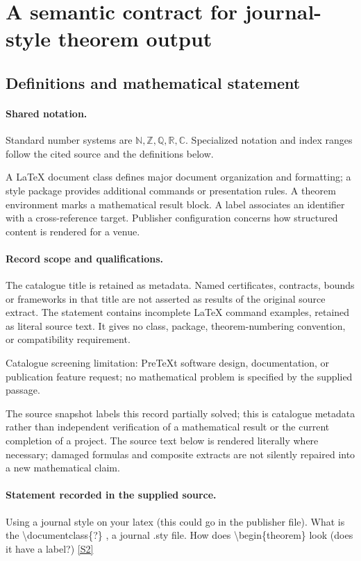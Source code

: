 \documentclass[11pt]{article}
\newcommand{\sref}[2]{\hyperlink{source:#1:#2}{[S#2]}}
\begin{document}
\section{A semantic contract for journal-style theorem output}\label{statement}

\subsection{Definitions and mathematical statement}

\paragraph{Shared notation.}Standard number systems are $\mathbb N,\mathbb Z,\mathbb Q,\mathbb R,\mathbb C$. Specialized notation and index ranges follow the cited source and the definitions below.


A LaTeX document class defines major document organization and formatting; a style package provides additional commands or presentation rules. A theorem environment marks a mathematical result block. A label associates an identifier with a cross-reference target. Publisher configuration concerns how structured content is rendered for a venue.
\paragraph{Record scope and qualifications.}
The catalogue title is retained as metadata. Named certificates, contracts, bounds or frameworks in that title are not asserted as results of the original source extract.
The statement contains incomplete LaTeX command examples, retained as literal source text. It gives no class, package, theorem-numbering convention, or compatibility requirement.

Catalogue screening limitation: PreTeXt software design, documentation, or publication feature request; no mathematical problem is specified by the supplied passage.

The source snapshot labels this record partially solved; this is catalogue metadata rather than independent verification of a mathematical result or the current completion of a project.
The source text below is rendered literally where necessary; damaged formulas and composite extracts are not silently repaired into a new mathematical claim.
\paragraph{Statement recorded in the supplied source.}
Using a journal style on your latex (this could go in the publisher file). What is the \textbackslash{}documentclass\{?\} , a journal .sty file. How does \textbackslash{}begin\{theorem\} look (does it have a label?) \sref{statement}{2}
\end{document}
